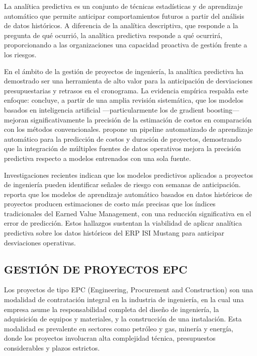 \documentclass{univalle-perfil}
\begin{document}
La analítica predictiva es un conjunto de técnicas estadísticas y de aprendizaje automático que permite anticipar comportamientos futuros a partir del análisis de datos históricos. A diferencia de la analítica descriptiva, que responde a la pregunta de qué ocurrió, la analítica predictiva responde a qué ocurrirá, proporcionando a las organizaciones una capacidad proactiva de gestión frente a los riesgos.

En el ámbito de la gestión de proyectos de ingeniería, la analítica predictiva ha demostrado ser una herramienta de alto valor para la anticipación de desviaciones presupuestarias y retrasos en el cronograma. La evidencia empírica respalda este enfoque: \textcite{AIcostEstimation2024} concluye, a partir de una amplia revisión sistemática, que los modelos basados en inteligencia artificial —particularmente los de gradient boosting— mejoran significativamente la precisión de la estimación de costos en comparación con los métodos convencionales. \textcite{AutoMLpipeline2025} propone un pipeline automatizado de aprendizaje automático para la predicción de costos y duración de proyectos, demostrando que la integración de múltiples fuentes de datos operativos mejora la precisión predictiva respecto a modelos entrenados con una sola fuente.

Investigaciones recientes indican que los modelos predictivos aplicados a proyectos de ingeniería pueden identificar señales de riesgo con semanas de anticipación. \textcite{MLcostForecasting2022} reporta que los modelos de aprendizaje automático basados en datos históricos de proyectos producen estimaciones de costo más precisas que los índices tradicionales del Earned Value Management, con una reducción significativa en el error de predicción. Estos hallazgos sustentan la viabilidad de aplicar analítica predictiva sobre los datos históricos del ERP ISI Mustang para anticipar desviaciones operativas.

\subsection{GESTIÓN DE PROYECTOS EPC}

Los proyectos de tipo EPC (Engineering, Procurement and Construction) son una modalidad de contratación integral en la industria de ingeniería, en la cual una empresa asume la responsabilidad completa del diseño de ingeniería, la adquisición de equipos y materiales, y la construcción de una instalación. Esta modalidad es prevalente en sectores como petróleo y gas, minería y energía, donde los proyectos involucran alta complejidad técnica, presupuestos considerables y plazos estrictos.
\end{document}
